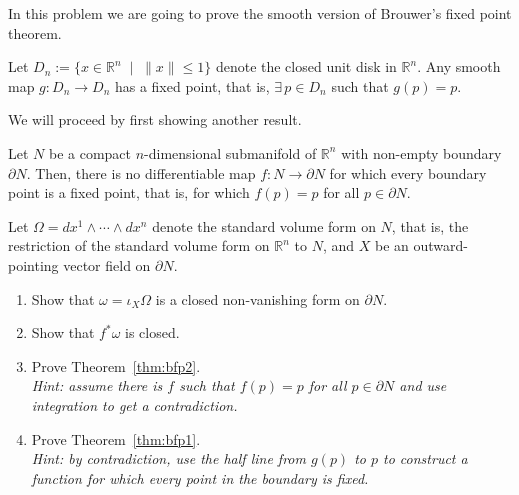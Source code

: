 \begin{exercise}
  In this problem we are going to prove the smooth version of Brouwer's fixed point theorem.

  \begin{theorem}\label{thm:bfp1}
    Let $D_n:=\{x\in\mathbb{R}^n\;\mid\;\|x\|\leq 1\}$ denote the closed unit disk in $\mathbb{R}^n$. %
    Any smooth map $g: D_n \to D_n$ has a fixed point, that is, $\exists\,p\in D_n$ such that $g(p) = p$.
  \end{theorem}

  We will proceed by first showing another result.

  \begin{theorem}\label{thm:bfp2}
    Let $N$ be a compact $n$-dimensional submanifold of $\mathbb{R}^n$ with non-empty boundary $\partial N$.
    Then, there is no differentiable map $f: N \to \partial N$ for which every boundary point is a fixed point, that is, for which $f(p) = p$ for all $p\in\partial N$.
  \end{theorem}

  Let $\Omega = dx^1 \wedge \cdots\wedge dx^n$ denote the standard volume form on $N$, that is, the restriction of the standard volume form on $\mathbb{R}^n$ to $N$,
  and $X$ be an outward-pointing vector field on $\partial N$.

  \begin{enumerate}
    \item Show that $\omega = \iota_X \Omega$ is a closed non-vanishing form on $\partial N$.
    \item Show that $f^*\omega$ is closed.
    \item Prove Theorem~\ref{thm:bfp2}.\\\textit{Hint: assume there is $f$ such that $f(p)=p$ for all $p\in \partial N$ and use integration to get a contradiction.}
    \item Prove Theorem~\ref{thm:bfp1}.\\\textit{Hint: by contradiction, use the half line from $g(p)$ to $p$ to construct a function for which every point in the boundary is fixed. }
  \end{enumerate}
\end{exercise}
